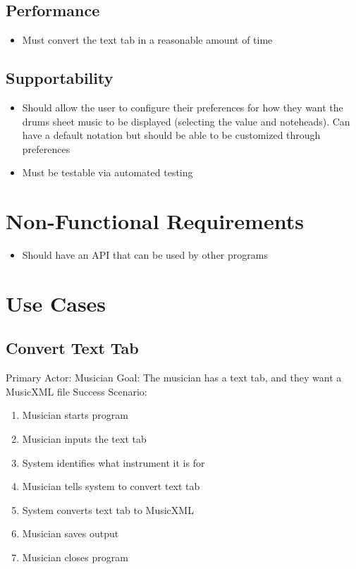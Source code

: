 \documentclass[11pt]{article}
\begin{document}
\subsection{Performance}
\label{sec:orge81867d}
\begin{itemize}
\item Must convert the text tab in a reasonable amount of time
\end{itemize}

\subsection{Supportability}
\label{sec:orgacd24fa}
\begin{itemize}
\item Should allow the user to configure their preferences for how they want the drums sheet music to be displayed (selecting the value and noteheads). Can have a default notation but should be able to be customized through preferences
\item Must be testable via automated testing
\end{itemize}

\section{Non-Functional Requirements}
\label{sec:org52447fc}
\begin{itemize}
\item Should have an API that can be used by other programs
\end{itemize}

\section{Use Cases}
\label{sec:org438b5a5}
\subsection{Convert Text Tab}
\label{sec:orge105ce4}
Primary Actor: Musician
Goal: The musician has a text tab, and they want a MusicXML file
Success Scenario:
\begin{enumerate}
\item Musician starts program
\item Musician inputs the text tab
\item System identifies what instrument it is for
\item Musician tells system to convert text tab
\item System converts text tab to MusicXML
\item Musician saves output
\item Musician closes program
\end{enumerate}
\end{document}
